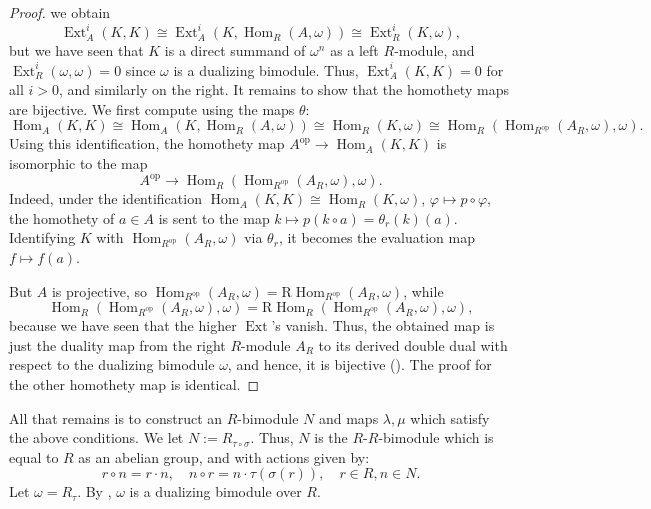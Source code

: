 \documentclass{amsart}
\theoremstyle{definition}
\newcommand{\opn}{\operatorname}
\newcommand{\mrm}[1]{\mathrm{#1}}
\numberwithin{equation}{section}
\begin{document}
\begin{proof}
we obtain
\[
\opn{Ext}^i_A(K,K) \cong \opn{Ext}^i_A(K,\opn{Hom}_R(A,\omega)) \cong
\opn{Ext}^i_R(K,\omega),
\]
but we have seen that $K$ is a direct summand of $\omega^n$ as a left $R$-module,
and $\opn{Ext}^i_R(\omega,\omega) = 0$ since $\omega$ is a dualizing bimodule.
Thus, $\opn{Ext}^i_A(K,K) = 0$ for all $i>0$, and similarly on the right.
It remains to show that the homothety maps are bijective.
We first compute using the maps $\theta$:
\[
\opn{Hom}_A(K,K) \cong \opn{Hom}_A(K,\opn{Hom}_R(A,\omega)) \cong 
\opn{Hom}_R(K,\omega) \cong \opn{Hom}_R(\opn{Hom}_{R^{\opn{op}}}(A_R,\omega),\omega).
\]
Using this identification,
the homothety map $A^{\opn{op}} \to \opn{Hom}_A(K,K)$ is isomorphic to the map
\[
A^{\opn{op}} \to \opn{Hom}_R(\opn{Hom}_{R^{\opn{op}}}(A_R,\omega),\omega).
\]
Indeed, under the identification $\opn{Hom}_A(K,K) \cong \opn{Hom}_R(K,\omega)$, $\varphi \mapsto p\circ\varphi$, the homothety of $a \in A$ is sent to the map $k \mapsto p(k\circ a) = \theta_r(k)(a)$. Identifying $K$ with $\opn{Hom}_{R^{\opn{op}}}(A_R,\omega)$ via $\theta_r$, it becomes the evaluation map $f \mapsto f(a)$.

But $A$ is projective, 
so $\opn{Hom}_{R^{\opn{op}}}(A_R,\omega) = \mrm{R}\opn{Hom}_{R^{\opn{op}}}(A_R,\omega)$,
while
\[
\opn{Hom}_R(\opn{Hom}_{R^{\opn{op}}}(A_R,\omega),\omega) = \mrm{R}\opn{Hom}_R(\opn{Hom}_{R^{\opn{op}}}(A_R,\omega),\omega),
\]
because we have seen that the higher $\opn{Ext}$'s vanish.
Thus, the obtained map is just the duality map from the right $R$-module $A_R$ to its derived double dual with respect to the dualizing bimodule $\omega$, and hence, it is bijective (\cite[Proposition 1.3]{YZ1}). The proof for the other homothety map is identical.
\end{proof}

All that remains is to construct an $R$-bimodule $N$ and maps $\lambda, \mu$ which satisfy the above conditions.
We let $N := R_{\tau\circ \sigma}$.
Thus, $N$ is the $R$-$R$-bimodule which is equal to $R$ as an abelian group, and with actions given by:
\[
r \circ n = r\cdot n, \quad n \circ r = n\cdot \tau(\sigma(r)), \quad r\in R, n\in N.
\]
Let $\omega = R_{\tau}$. By ,
$\omega$ is a dualizing bimodule over $R$.
\end{document}
